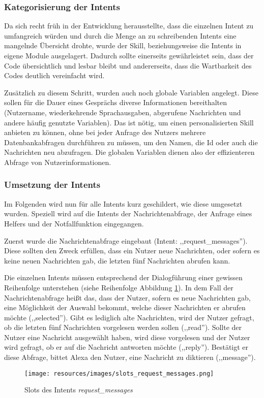 \subsubsection{Kategorisierung der Intents}
Da sich recht früh in der Entwicklung herausstellte, dass die einzelnen Intent zu umfangreich würden und durch die Menge an zu schreibenden Intents eine mangelnde Übersicht drohte, wurde der Skill, beziehungsweise die Intents in eigene Module ausgelagert. Dadurch sollte einerseits gewährleistet sein, dass der Code übersichtlich und lesbar bleibt und andererseits, dass die Wartbarkeit des Codes deutlich vereinfacht wird.

Zusätzlich zu diesem Schritt, wurden auch noch globale Variablen angelegt. Diese sollen für die Dauer eines Gesprächs diverse Informationen bereithalten (Nutzername, wiederkehrende Sprachausgaben, abgerufene Nachrichten und andere häufig genutzte Variablen).
Das ist nötig, um einen personalisierten Skill anbieten zu können, ohne bei jeder Anfrage des Nutzers mehrere Datenbankabfragen durchführen zu müssen, um den Namen, die Id oder auch die Nachrichten neu abzufragen. Die globalen Variablen dienen also der effizienteren Abfrage von Nutzerinformationen.
\subsubsection{Umsetzung der Intents}
Im Folgenden wird nun für alle Intents kurz geschildert, wie diese umgesetzt wurden. Speziell wird auf die Intents der Nachrichtenabfrage, der Anfrage eines Helfers und der Notfallfunktion eingegangen.

Zuerst wurde die Nachrichtenabfrage eingebaut (Intent: ,,request\_messages''). Diese sollten den Zweck erfüllen, dass ein Nutzer neue Nachrichten, oder sofern es keine neuen Nachrichten gab, die letzten fünf Nachrichten abrufen kann.

Die einzelnen Intents müssen entsprechend der Dialogführung einer gewissen Reihenfolge unterstehen (siehe Reihenfolge Abbildung \ref{fig:slotsRequest}). In dem Fall der Nachrichtenabfrage heißt das, dass der Nutzer, sofern es neue Nachrichten gab, eine Möglichkeit der Auswahl bekommt, welche dieser Nachrichten er abrufen möchte (,,selected''). Gibt es lediglich alte Nachrichten, wird der Nutzer gefragt, ob die letzten fünf Nachrichten vorgelesen werden sollen (,,read''). Sollte der Nutzer eine Nachricht ausgewählt haben, wird diese vorgelesen und der Nutzer wird gefragt, ob er auf die Nachricht antworten möchte (,,reply''). Bestätigt er diese Abfrage, bittet Alexa den Nutzer, eine Nachricht zu diktieren (,,message'').
\begin{figure} [H]
    \texttt{[image: resources/images/slots\_request\_messages.png]}
    \caption{Slots des Intents \textit{request\_messages}}
    \label{fig:slotsRequest}
\end{figure}

